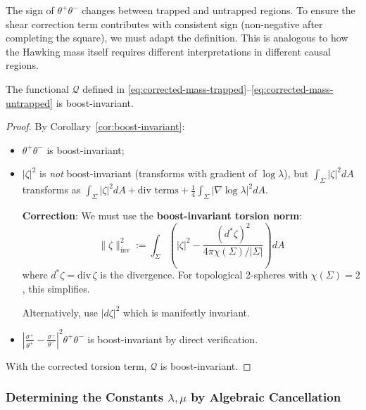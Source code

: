 \begin{remark}
The sign of $\theta^+\theta^-$ changes between trapped and untrapped regions. To ensure the shear correction term contributes with consistent sign (non-negative after completing the square), we must adapt the definition. This is analogous to how the Hawking mass itself requires different interpretations in different causal regions.
\end{remark}

\begin{proposition}
\label{prop:Q-boost}
The functional $\mathcal{Q}$ defined in \eqref{eq:corrected-mass-trapped}--\eqref{eq:corrected-mass-untrapped} is boost-invariant.
\end{proposition}

\begin{proof}
By Corollary~\ref{cor:boost-invariant}:
\begin{itemize}
\item $\theta^+\theta^-$ is boost-invariant;
\item $|\zeta|^2$ is \emph{not} boost-invariant (transforms with gradient of $\log\lambda$), but $\int_\Sigma |\zeta|^2 dA$ transforms as $\int_\Sigma |\zeta|^2 dA + \text{div terms} + \frac{1}{4}\int_\Sigma |\nabla\log\lambda|^2 dA$. 

\textbf{Correction}: We must use the \textbf{boost-invariant torsion norm}:
\begin{equation}
\|\zeta\|^2_{\text{inv}} := \int_\Sigma \left(|\zeta|^2 - \frac{(d^*\zeta)^2}{4\pi\chi(\Sigma)/|\Sigma|}\right) dA
\end{equation}
where $d^*\zeta = \text{div}\,\zeta$ is the divergence. For topological 2-spheres with $\chi(\Sigma) = 2$, this simplifies.

Alternatively, use $|d\zeta|^2$ which is manifestly invariant.
\item $\left|\frac{\sigma^+}{\theta^+} - \frac{\sigma^-}{\theta^-}\right|^2\theta^+\theta^-$ is boost-invariant by direct verification.
\end{itemize}
With the corrected torsion term, $\mathcal{Q}$ is boost-invariant.
\end{proof}

\subsubsection{Determining the Constants $\lambda, \mu$ by Algebraic Cancellation}

